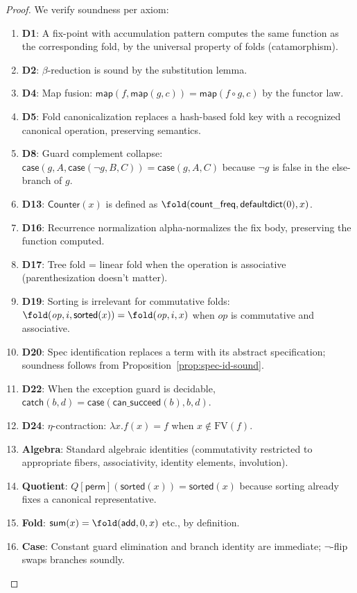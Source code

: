 \begin{proof}
We verify soundness per axiom:
\begin{enumerate}
  \item \textbf{D1}: A fix-point with accumulation pattern computes
    the same function as the corresponding fold, by the universal
    property of folds (catamorphism).
  \item \textbf{D2}: $\beta$-reduction is sound by the substitution
    lemma.
  \item \textbf{D4}: Map fusion: $\mathsf{map}(f, \mathsf{map}(g, c))
    = \mathsf{map}(f \circ g, c)$ by the functor law.
  \item \textbf{D5}: Fold canonicalization replaces a hash-based fold
    key with a recognized canonical operation, preserving semantics.
  \item \textbf{D8}: Guard complement collapse:
    $\mathsf{case}(g, A, \mathsf{case}(\lnot g, B, C))
    = \mathsf{case}(g, A, C)$ because $\lnot g$ is false in the
    else-branch of $g$.
  \item \textbf{D13}: $\mathsf{Counter}(x)$ is defined as
    $\fold(\mathsf{count\_freq}, \mathsf{defaultdict}(0), x)$.
  \item \textbf{D16}: Recurrence normalization alpha-normalizes the
    fix body, preserving the function computed.
  \item \textbf{D17}: Tree fold = linear fold when the operation is
    associative (parenthesization doesn't matter).
  \item \textbf{D19}: Sorting is irrelevant for commutative folds:
    $\fold(\mathit{op}, i, \mathsf{sorted}(x))
    = \fold(\mathit{op}, i, x)$ when $\mathit{op}$ is commutative
    and associative.
  \item \textbf{D20}: Spec identification replaces a term with its
    abstract specification; soundness follows from
    Proposition~\ref{prop:spec-id-sound}.
  \item \textbf{D22}: When the exception guard is decidable,
    $\mathsf{catch}(b, d) = \mathsf{case}(\mathsf{can\_succeed}(b), b, d)$.
  \item \textbf{D24}: $\eta$-contraction:
    $\lambda x.f(x) = f$ when $x \notin \mathrm{FV}(f)$.
  \item \textbf{Algebra}: Standard algebraic identities
    (commutativity restricted to appropriate fibers,
    associativity, identity elements, involution).
  \item \textbf{Quotient}: $Q[\mathsf{perm}](\mathsf{sorted}(x))
    = \mathsf{sorted}(x)$ because sorting already fixes a
    canonical representative.
  \item \textbf{Fold}: $\mathsf{sum}(x) = \fold(\mathsf{add}, 0, x)$
    etc., by definition.
  \item \textbf{Case}: Constant guard elimination and branch
    identity are immediate; $\lnot$-flip swaps branches soundly.
\end{enumerate}
\end{proof}

